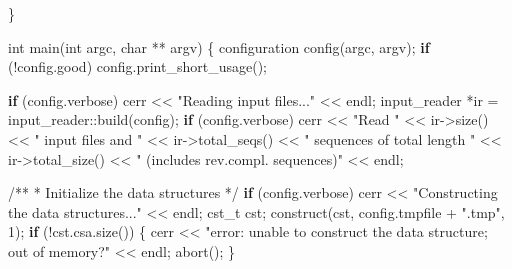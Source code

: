 \documentclass[
]{article}
\newenvironment{Shaded}{\begin{snugshade}}{\end{snugshade}}
\newcommand{\CommentTok}[1]{\textcolor[rgb]{0.48,0.49,0.49}{#1}}
\newcommand{\ControlFlowTok}[1]{\textcolor[rgb]{0.99,0.74,0.29}{\textbf{#1}}}
\newcommand{\DataTypeTok}[1]{\textcolor[rgb]{0.16,0.50,0.73}{#1}}
\newcommand{\DecValTok}[1]{\textcolor[rgb]{0.96,0.45,0.00}{#1}}
\newcommand{\NormalTok}[1]{\textcolor[rgb]{0.81,0.81,0.76}{#1}}
\newcommand{\OperatorTok}[1]{\textcolor[rgb]{0.81,0.81,0.76}{#1}}
\newcommand{\StringTok}[1]{\textcolor[rgb]{0.96,0.31,0.31}{#1}}
\begin{document}
\begin{Shaded}
\begin{Highlighting}[]
\OperatorTok{\}}
    
\DataTypeTok{int}\NormalTok{ main}\OperatorTok{(}\DataTypeTok{int}\NormalTok{ argc}\OperatorTok{,} \DataTypeTok{char} \OperatorTok{**}\NormalTok{ argv}\OperatorTok{)}
\OperatorTok{\{}
\NormalTok{    configuration config}\OperatorTok{(}\NormalTok{argc}\OperatorTok{,}\NormalTok{ argv}\OperatorTok{);}
    \ControlFlowTok{if} \OperatorTok{(!}\NormalTok{config}\OperatorTok{.}\NormalTok{good}\OperatorTok{)}
\NormalTok{        config}\OperatorTok{.}\NormalTok{print\_short\_usage}\OperatorTok{();}

    \ControlFlowTok{if} \OperatorTok{(}\NormalTok{config}\OperatorTok{.}\NormalTok{verbose}\OperatorTok{)}
\NormalTok{        cerr }\OperatorTok{\textless{}\textless{}} \StringTok{"Reading input files..."} \OperatorTok{\textless{}\textless{}}\NormalTok{ endl}\OperatorTok{;}
\NormalTok{    input\_reader }\OperatorTok{*}\NormalTok{ir }\OperatorTok{=}\NormalTok{ input\_reader}\OperatorTok{::}\NormalTok{build}\OperatorTok{(}\NormalTok{config}\OperatorTok{);}
    \ControlFlowTok{if} \OperatorTok{(}\NormalTok{config}\OperatorTok{.}\NormalTok{verbose}\OperatorTok{)}
\NormalTok{        cerr }\OperatorTok{\textless{}\textless{}} \StringTok{"Read "} \OperatorTok{\textless{}\textless{}}\NormalTok{ ir}\OperatorTok{{-}\textgreater{}}\NormalTok{size}\OperatorTok{()} \OperatorTok{\textless{}\textless{}} \StringTok{" input files and "} \OperatorTok{\textless{}\textless{}}\NormalTok{ ir}\OperatorTok{{-}\textgreater{}}\NormalTok{total\_seqs}\OperatorTok{()} \OperatorTok{\textless{}\textless{}} \StringTok{" sequences of total length "} \OperatorTok{\textless{}\textless{}}\NormalTok{ ir}\OperatorTok{{-}\textgreater{}}\NormalTok{total\_size}\OperatorTok{()} \OperatorTok{\textless{}\textless{}} \StringTok{" (includes rev.compl. sequences)"} \OperatorTok{\textless{}\textless{}}\NormalTok{ endl}\OperatorTok{;}
    
    \CommentTok{/**}
\CommentTok{     * Initialize the data structures}
\CommentTok{     */}
    \ControlFlowTok{if} \OperatorTok{(}\NormalTok{config}\OperatorTok{.}\NormalTok{verbose}\OperatorTok{)}
\NormalTok{        cerr }\OperatorTok{\textless{}\textless{}} \StringTok{"Constructing the data structures..."} \OperatorTok{\textless{}\textless{}}\NormalTok{ endl}\OperatorTok{;}
\NormalTok{    cst\_t cst}\OperatorTok{;}    
\NormalTok{    construct}\OperatorTok{(}\NormalTok{cst}\OperatorTok{,}\NormalTok{ config}\OperatorTok{.}\NormalTok{tmpfile }\OperatorTok{+} \StringTok{".tmp"}\OperatorTok{,} \DecValTok{1}\OperatorTok{);}
    \ControlFlowTok{if} \OperatorTok{(!}\NormalTok{cst}\OperatorTok{.}\NormalTok{csa}\OperatorTok{.}\NormalTok{size}\OperatorTok{())}
    \OperatorTok{\{}
\NormalTok{        cerr }\OperatorTok{\textless{}\textless{}} \StringTok{"error: unable to construct the data structure; out of memory?"} \OperatorTok{\textless{}\textless{}}\NormalTok{ endl}\OperatorTok{;} 
\NormalTok{        abort}\OperatorTok{();}
    \OperatorTok{\}}
    

\end{Highlighting}
\end{Shaded}
\end{document}
